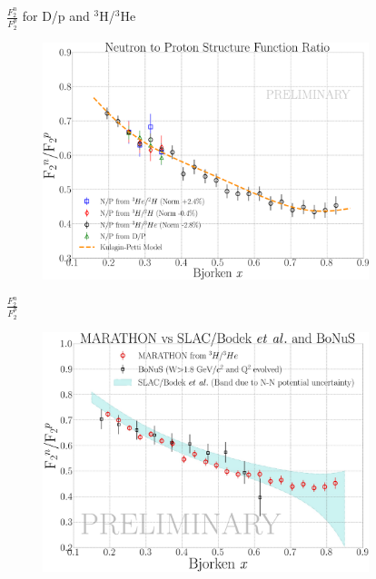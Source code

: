 \documentclass{beamer}
\begin{document}
\begin{frame}{$\frac{F_2^n}{F_2^p}$ for D/p and $^3$H/$^3$He}
\vspace{-20pt}
\begin{figure}
	\includegraphics[width=9.5cm]{../images/MARA_F2_1.pdf}
\end{figure}
\end{frame}

\begin{frame}{$\frac{F_2^n}{F_2^p}$}
\vspace{-20pt}
\begin{figure}
	\includegraphics[width=9.5cm]{../images/MARA_F2.pdf}
\end{figure}
\end{frame}
\end{document}
